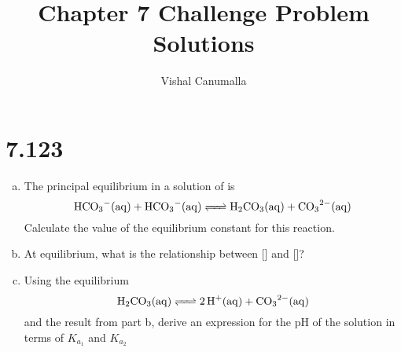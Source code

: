 \documentclass[11 pt]{article}
\title{Chapter 7 Challenge Problem Solutions}
\author{Vishal Canumalla}
\begin{document}
    \maketitle

    \section*{7.123}
    \begin{problemBox}
        \begin{enumerate}[a.]
            \item The principal equilibrium in a solution of 
            is $$\ce{HCO3-(aq) + HCO3-(aq) <=> H2CO3(aq) + CO3^2-(aq)}$$
            Calculate the value of the equilibrium constant for this reaction.
            \item At equilibrium, what is the relationship between []
            and []?
            \item Using the equilibrium $$\ce{H2CO3(aq) <=> 2H+(aq) + CO3^2-(aq)}$$
            and the result from part b, derive an expression for the pH of the solution in terms of $K_{a_1}$ and $K_{a_2}$
        \end{enumerate}
    \end{problemBox}
\end{document}
